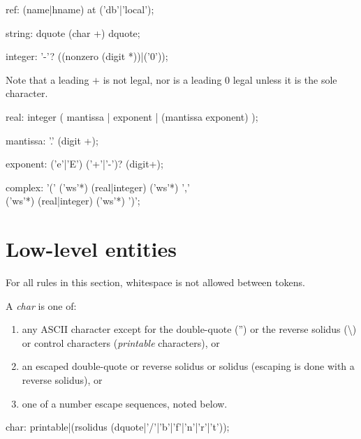\documentclass{memarticle}
\begin{document}
\begin{rail}
  ref: (name|hname) at ('db'|'local');
\end{rail}

\begin{rail}
string: dquote (char +) dquote;
\end{rail}

\begin{rail}
integer: '-'? ((nonzero (digit *))|('0'));
\end{rail}
Note that a leading $+$ is not legal,
nor is a leading 0 legal unless it is the sole character.

\begin{rail}
 real: integer ( mantissa | exponent | (mantissa exponent) );
\end{rail}

\begin{rail}
	mantissa: '.' (digit +);
\end{rail}

\begin{rail}
	exponent: ('e'|'E') ('+'|'-')? (digit+);
\end{rail}

\begin{rail}
complex: '(' ('ws'*) (real|integer) ('ws'*) ',' \\ ('ws'*) (real|integer) ('ws'*) ')';
\end{rail}

\section{Low-level entities}

For all rules in this section,
whitespace is not allowed between tokens.

A \emph{char} is one of:
\begin{enumerate}
\item any ASCII character except for
the double-quote ('') 
or the reverse solidus (\textbackslash)
or control characters
(\emph{printable} characters), or
\item an escaped double-quote or reverse solidus or solidus
(escaping is done with a reverse solidus), or
\item one of a number escape sequences, noted below.
\end{enumerate}
\begin{rail}
char: printable|(rsolidus (dquote|'/'|'b'|'f'|'n'|'r'|'t'));
\end{rail}
\end{document}
